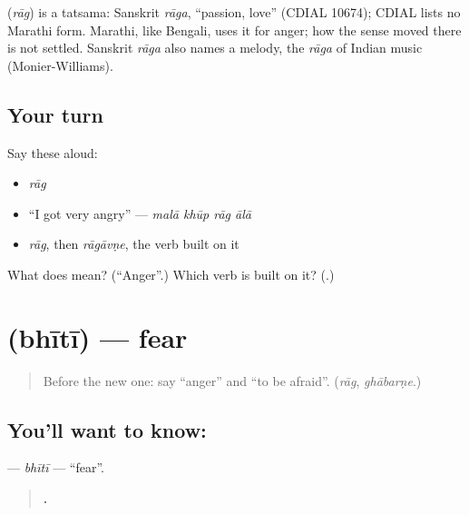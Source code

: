 \begin{cousinweb}
\textbf{} (\emph{rāg}) is a tatsama: Sanskrit \emph{rāga}, \textquotedblleft{}passion, love\textquotedblright{} (CDIAL 10674); CDIAL lists no Marathi form. Marathi, like Bengali, uses it for anger; how the sense moved there is not settled. Sanskrit \emph{rāga} also names a melody, the \emph{rāga} of Indian music (Monier-Williams).
\end{cousinweb}

\subsection*{Your turn}
Say these aloud:

\begin{itemize}
\raggedright
  \item \emph{rāg}
  \item \textquotedblleft{}I got very angry\textquotedblright{} — \emph{malā khūp rāg ālā}
  \item \emph{rāg}, then \emph{rāgāvṇe}, the verb built on it
\end{itemize}

\begin{tcolorbox}[breakable,colback=teal!4,colframe=teal!35!black,title={Before you move on}]
What does \textbf{} mean? (\textquotedblleft{}Anger\textquotedblright{}.) Which verb is built on it? (\textbf{}.)
\end{tcolorbox}
\section[\texorpdfstring{\mr{भीती} (bhītī)}{भीती (bhītī)}]{ (bhītī) — fear}

\label{lesson:MR-C284-bhiti}



\begin{quote}
Before the new one: say \textquotedblleft{}anger\textquotedblright{} and \textquotedblleft{}to be afraid\textquotedblright{}. (\emph{rāg}, \emph{ghābarṇe}.)
\end{quote}

\subsection*{You'll want to know: }
\textbf{} — \emph{bhītī} — \textquotedblleft{}fear\textquotedblright{}.

\begin{quote}
\textbf{   .}
\end{quote}

